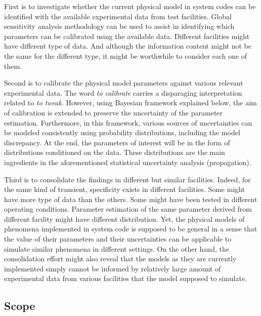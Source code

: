 \documentclass[11pt,titlepage]{article}
\begin{document}
First is to investigate whether the current physical model in system codes can be identified with the available experimental data from test facilities.
Global sensitivity analysis methodology can be used to assist in identifying which parameters can be calibrated using the available data.
Different facilities might have different type of data.
And although the information content might not be the same for the different type, it might be worthwhile to consider each one of them.

Second is to calibrate the physical model parameters against various relevant experimental data. 
The word \emph{to calibrate} carries a disparaging interpretation related to \emph{to tweak}. 
However, using Bayesian framework explained below, the aim of calibration is extended to preserve the uncertainty of the parameter estimation.
Furthermore, in this framework, various sources of uncertainties can be modeled consistently using probability distributions, including the model discrepancy.
At the end, the parameters of interest will be in the form of distributions conditioned on the data.
These distributions are the main ingredients in the aforementioned statistical uncertainty analysis (propagation).

Third is to consolidate the findings in different but similar facilities.
Indeed, for the same kind of transient, specificity exists in different facilities.
Some might have more type of data than the others. 
Some might have been tested in different operating conditions.
Parameter estimation of the same parameter derived from different facility might have different distribution. 
Yet, the physical models of phenomena implemented in system code is supposed to be general in a sense that the value of their parameters and their uncertainties can be applicable to simulate similar phenomena in different settings. 
On the other hand, the consolidation effort might also reveal that the models as they are currently implemented simply cannot be informed by relatively large amount of experimental data from various facilities that the model supposed to simulate. 
 
\subsection{Scope}  
\end{document}
